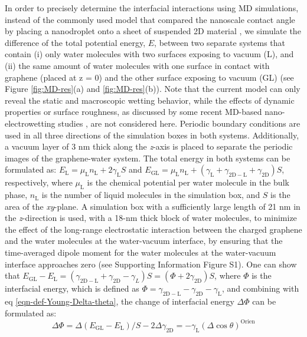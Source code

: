 \documentclass[journal=langd5,manuscript=article,email=true,hyperref=true,keywords=true]{achemso}
\begin{document}
In order to precisely determine the interfacial interactions using MD
simulations, instead of the commonly used model that compared the
nanoscale contact angle by placing a nanodroplet onto a sheet of
suspended 2D material
\cite{ostrowski_tunable_2014,daub_electrowetting_2007,ren_interfacial_2015,Taherian_2015},
we simulate the difference of the total potential energy, \(E\),
between two separate systems that contain (i) only water molecules
with two surfaces exposing to vacuum (L), and (ii) the same amount of
water molecules with one surface in contact with graphene (placed at z
= 0) and the other surface exposing to vacuum (GL) (see Figure
\ref{fig:MD-res}(a) and \ref{fig:MD-res}(b)). Note that the current
model can only reveal the static and macroscopic wetting behavior,
while the effects of dynamic properties or surface roughness, as
discussed by some recent MD-based nano-electrowetting studies
\cite{Yuan_2010_PF,Zhao_2015_pillar}, are not considered here.
Periodic boundary conditions are used in all three directions of the
simulation boxes in both systems. Additionally, a vacuum layer of 3 nm
thick along the \emph{z}-axis is placed to separate the periodic
images of the graphene-water system. The total energy in both systems
can be formulated as:
\(E_{\mathrm{L}} = \mu_{\mathrm{L}}n_{\mathrm{L}} +
2\gamma_{\mathrm{L}}S\) and
\(E_{\mathrm{GL}}=\mu_{\mathrm{L}}n_{\mathrm{L}}+(\gamma_{\mathrm{L}}
+ \gamma_{\mathrm{2D-L}} + \gamma_{\mathrm{2D}})S\), respectively,
where \(\mu_{\mathrm{L}}\) is the chemical potential per water
molecule in the bulk phase, \(n_{\mathrm{L}}\) is the number of liquid
molecules in the simulation box, and \(S\) is the area of the
\emph{xy}-plane.  A simulation box with a sufficiently large length of
21 nm in the \emph{z}-direction is used, with a 18-nm thick block of
water molecules, to minimize the effect of the long-range
electrostatic interaction between the charged graphene and the water
molecules at the water-vacuum interface, by ensuring that the
time-averaged dipole moment for the water molecules at the
water-vacuum interface approaches zero (see Supporting Information
Figure S1).  One can show that
\(E_{\mathrm{GL}} - E_{\mathrm{L}} = (\gamma_{\mathrm{2D-L}} +
\gamma_{\mathrm{2D}} - \gamma_{L})S = (\Phi + 2
\gamma_{\mathrm{2D}})S\), where \(\Phi\) is the interfacial energy,
which is defined as
\(\Phi = \gamma_{\mathrm{2D-L}} - \gamma_{\mathrm{2D}} -
\gamma_{\mathrm{L}}\), and combining with eq
\ref{eqn-def-Young-Delta-theta}, the change of interfacial energy
\(\Delta \Phi\) can be formulated as:
\begin{equation}
\label{eqn-Delta-Phi-Delta-cos}
\Delta \Phi = \Delta (E_{\mathrm{GL}} - E_{\mathrm{L}})/S - 2\Delta \gamma_{\mathrm{2D}} = -\gamma_{\mathrm{L}} (\Delta \cos \theta)^{\mathrm{Orien}}
\end{equation}
\end{document}
